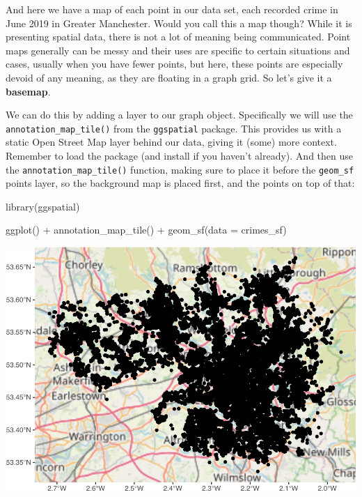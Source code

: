 \documentclass[
  krantz2]{krantz}
\makeatletter
\newenvironment{Shaded}{\begin{snugshade}}{\end{snugshade}}
\newcommand{\AttributeTok}[1]{\textcolor[rgb]{0.61,0.61,0.61}{#1}}
\newcommand{\FunctionTok}[1]{\textcolor[rgb]{0,0,0}{#1}}
\newcommand{\NormalTok}[1]{#1}
\newcommand{\SpecialCharTok}[1]{\textcolor[rgb]{0,0,0}{#1}}
\newenvironment{kframe}{%
\medskip{}
\setlength{\fboxsep}{.8em}
 \def\at@end@of@kframe{}%
 \ifinner\ifhmode%
  \def\at@end@of@kframe{\end{minipage}}%
  \begin{minipage}{\columnwidth}%
 \fi\fi%
 \def\FrameCommand##1{\hskip\@totalleftmargin \hskip-\fboxsep
 \colorbox{shadecolor}{##1}\hskip-\fboxsep
     \hskip-\linewidth \hskip-\@totalleftmargin \hskip\columnwidth}%
 \MakeFramed {\advance\hsize-\width
   \@totalleftmargin\z@ \linewidth\hsize
   \@setminipage}}%
 {\par\unskip\endMakeFramed%
 \at@end@of@kframe}
\renewenvironment{Shaded}{\begin{kframe}}{\end{kframe}}
\makeatother
\begin{document}
And here we have a map of each point in our data set, each recorded crime in June 2019 in Greater Manchester. Would you call this a map though? While it is presenting spatial data, there is not a lot of meaning being communicated. Point maps generally can be messy and their uses are specific to certain situations and cases, usually when you have fewer points, but here, these points are especially devoid of any meaning, as they are floating in a graph grid. So let's give it a \textbf{basemap}.

We can do this by adding a layer to our graph object. Specifically we will use the \texttt{annotation\_map\_tile()} from the \texttt{ggspatial} package. This provides us with a static Open Street Map layer behind our data, giving it (some) more context. Remember to load the package (and install if you haven't already). And then use the \texttt{annotation\_map\_tile()} function, making sure to place it before the \texttt{geom\_sf} points layer, so the background map is placed first, and the points on top of that:

\begin{Shaded}
\begin{Highlighting}[]
\FunctionTok{library}\NormalTok{(ggspatial)}

\FunctionTok{ggplot}\NormalTok{() }\SpecialCharTok{+} 
 \FunctionTok{annotation\_map\_tile}\NormalTok{() }\SpecialCharTok{+}
  \FunctionTok{geom\_sf}\NormalTok{(}\AttributeTok{data =}\NormalTok{ crimes\_sf)}
\end{Highlighting}
\end{Shaded}

\includegraphics{crime_mapping_files/figure-latex/unnamed-chunk-15-1.pdf}
\end{document}
